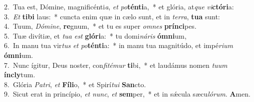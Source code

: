 {2.~}Tua est, Dómine, magnificénti\textit{a}, \textit{et} \textit{po}\textbf{tén}\textbf{ti}a,~* et glória, at\textit{que} \textit{vi}\textbf{ctó}\textbf{ri}a:\\
{3.~}\textit{Et} \textbf{ti}\textbf{bi} laus:~* cuncta enim quæ in cælo sunt, et in \textit{ter}\textit{ra}, \textbf{tu}\textbf{a} sunt:\\
{4.~}Tuum, \textit{Dó}\textit{mi}\textit{ne}, \textbf{re}gnum,~* et tu es super \textit{om}\textit{nes} \textbf{prín}\textbf{ci}pes.\\
{5.~}Tuæ divítiæ, et \textit{tu}\textit{a} \textit{est} \textbf{gló}\textbf{ri}a:~* tu domi\textit{ná}\textit{ris} \textbf{óm}\textbf{ni}um,\\
{6.~}In manu tua vir\textit{tus} \textit{et} \textit{po}\textbf{tén}\textbf{ti}a:~* in manu tua magnitúdo, et impé\textit{ri}\textit{um} \textbf{óm}\textbf{ni}um.\\
{7.~}Nunc ígitur, Deus noster, con\textit{fi}\textit{té}\textit{mur} \textbf{ti}bi,~* et laudámus nomen \textit{tu}\textit{um} \textbf{ín}\textbf{cly}tum.\\
{8.~}Glória \textit{Pa}\textit{tri}, \textit{et} \textbf{Fí}\textbf{li}o,~* et Spirí\textit{tu}\textit{i} \textbf{San}cto.\\
{9.~}Sicut erat in princípio, \textit{et} \textit{nunc}, \textit{et} \textbf{sem}per,~* et in sǽcula sæcu\textit{ló}\textit{rum}. \textbf{A}men.\\
